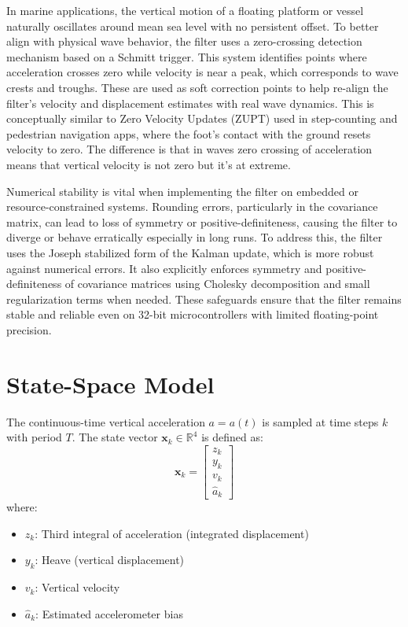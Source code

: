 \documentclass[11pt,letterpaper]{article}
\begin{document}
In marine applications, the vertical motion of a floating platform or vessel naturally oscillates around mean sea level with no persistent offset. To better align with physical wave behavior, the filter uses a zero-crossing detection mechanism based on a Schmitt trigger. This system identifies points where acceleration crosses zero while velocity is near a peak, which corresponds to wave crests and troughs. These are used as soft correction points to help re-align the filter’s velocity and displacement estimates with real wave dynamics. This is conceptually similar to Zero Velocity Updates (ZUPT) used in step-counting and pedestrian navigation apps, where the foot’s contact with the ground resets velocity to zero. The difference is that in waves zero crossing of acceleration means that vertical velocity is not zero but it's at extreme.

Numerical stability is vital when implementing the filter on embedded or resource-constrained systems. Rounding errors, particularly in the covariance matrix, can lead to loss of symmetry or positive-definiteness, causing the filter to diverge or behave erratically especially in long runs. To address this, the filter uses the Joseph stabilized form of the Kalman update, which is more robust against numerical errors. It also explicitly enforces symmetry and positive-definiteness of covariance matrices using Cholesky decomposition and small regularization terms when needed. These safeguards ensure that the filter remains stable and reliable even on 32-bit microcontrollers with limited floating-point precision.

\section{State-Space Model}

The continuous-time vertical acceleration \( a = a(t) \) is sampled at time steps \( k \) with period \( T \). The state vector \( \mathbf{x}_k \in \mathbb{R}^4 \) is defined as:
\begin{equation}
\mathbf{x}_k = \begin{bmatrix}
z_k \\
y_k \\
v_k \\
\hat{a}_k
\end{bmatrix}
\end{equation}
where:
\begin{itemize}
  \item \( z_k \): Third integral of acceleration (integrated displacement)
  \item \( y_k \): Heave (vertical displacement)
  \item \( v_k \): Vertical velocity
  \item \( \hat{a}_k \): Estimated accelerometer bias
\end{itemize}
\end{document}
